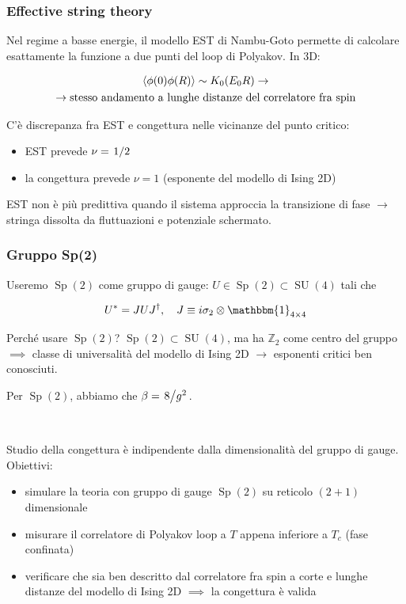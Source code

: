 \documentclass{beamer}
\newcommand{\SU}{\operatorname{SU}}
\newcommand{\Sp}{\operatorname{Sp}}
\newcommand{\id}{\mathbbm{1}}
\begin{document}
\begin{frame}
	\frametitle{Effective string theory}

	Nel regime a basse energie, il modello EST di Nambu-Goto permette di calcolare esattamente
	la funzione a due punti del loop di Polyakov. In 3D:

	\begin{equation*}
		\begin{gathered}
			\expval{\phi(0) \phi(R)} \sim K_0(E_0 R) \rightarrow \\
			\rightarrow \text{stesso andamento a lunghe	distanze del correlatore fra spin}			
		\end{gathered}
	\end{equation*}

	C'è \alert{discrepanza fra EST e congettura} nelle vicinanze del punto critico:

	\begin{itemize}
		\item EST prevede $\nu = \flatfrac{1}{2}$
		\item la congettura prevede $\nu = 1$ (esponente del modello di Ising 2D)
	\end{itemize}

	EST non è più predittiva quando il sistema approccia la transizione di fase $\rightarrow$ stringa dissolta 
	da fluttuazioni e potenziale schermato.

\end{frame}

\begin{frame}
	\frametitle{Gruppo Sp(2)}

	Useremo $\Sp(2)$ come gruppo di gauge: $U \in \Sp(2) \subset \SU(4)$ tali che
	
	\begin{equation*}
		U^* = J U J^\dagger \qc J \equiv i \sigma_2 \otimes \id_{4 \times 4} 
	\end{equation*}

	Perché usare $\Sp(2)$? $\Sp(2) \subset \SU(4)$, ma ha $\mathbb{Z}_2$ come centro del gruppo $\implies$ classe di universalità del
	modello di Ising 2D $\rightarrow$ esponenti critici ben conosciuti. 
	
	Per $\Sp(2)$, abbiamo che $\beta = \flatfrac{8}{g^2}$.

	\
	
	Studio della congettura è \alert{indipendente dalla dimensionalità del gruppo di gauge}. Obiettivi:
	\begin{itemize}
		\item simulare la teoria con gruppo di gauge $\Sp(2)$ su reticolo $(2+1)$ dimensionale
		\item misurare il correlatore di Polyakov loop a $T$ appena inferiore a $T_c$ (fase confinata)
		\item verificare che sia ben descritto dal correlatore fra spin a corte e lunghe distanze del modello
		di Ising 2D $\implies$ la congettura è valida
	\end{itemize}

\end{frame}
\end{document}
